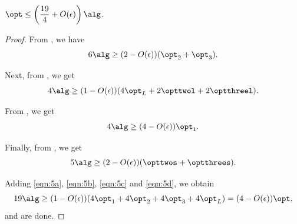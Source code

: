 \begin{enumerate}
    \begin{claim}
    \label{cla:19by4}
        $\displaystyle\opt \le \left(\frac{19}{4}+O(\epsilon)\right)\alg$.
    \end{claim}
    \begin{proof}
        From , we have
        \begin{equation}
        \label{eqn:5a}
            6\alg \ge (2-O(\epsilon))(\opt_2 + \opt_3).
        \end{equation}

        Next, from , we get
        \begin{equation}
        \label{eqn:5b}
            4\alg \ge (1-O(\epsilon))(4\opt_L + 2\opttwol + 2\optthreel). 
        \end{equation}

        From , we get
        \begin{equation}
        \label{eqn:5c}
            4\alg \ge (4-O(\epsilon))\opt_1.
        \end{equation}

        Finally, from , we get
        \begin{equation}
        \label{eqn:5d}
            5\alg \ge (2-O(\epsilon))(\opttwos + \optthrees).
        \end{equation}

        Adding \eqref{eqn:5a}, \eqref{eqn:5b}, \eqref{eqn:5c} and \eqref{eqn:5d}, we obtain
        \[ 19\alg \ge (1-O(\epsilon))(4\opt_1 + 4\opt_2 + 4\opt_3 + 4\opt_L) = (4-O(\epsilon))\opt,\]
        and are done.        
    \end{proof}



    
    
    


\end{enumerate}
